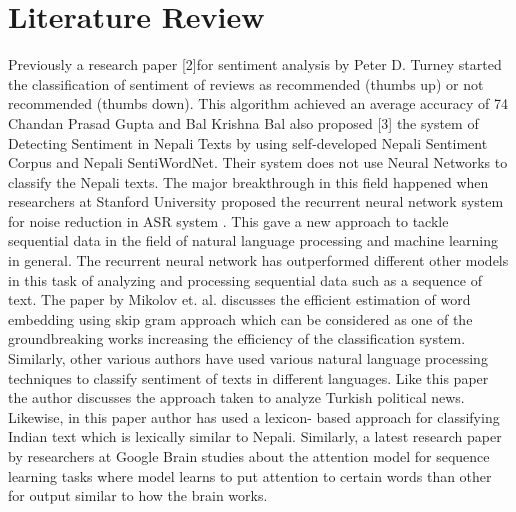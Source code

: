     \chapter{Literature Review}
       Previously a research paper [2]for sentiment analysis by Peter D. Turney started the
classification of sentiment of reviews as recommended (thumbs up) or not
recommended (thumbs down). This algorithm achieved an average accuracy of 74%
Chandan Prasad Gupta and Bal Krishna Bal also proposed [3] the system of Detecting
Sentiment in Nepali Texts by using self-developed Nepali Sentiment Corpus and Nepali
SentiWordNet. Their system does not use Neural Networks to classify the Nepali texts.
The major breakthrough in this field happened when researchers at Stanford University
proposed the recurrent neural network system for noise reduction in ASR system
\cite{liu2012sentiment}
.
This gave a new approach to tackle sequential data in the field of natural language
processing and machine learning in general. The recurrent neural network has
outperformed different other models in this task of analyzing and processing sequential
data such as a sequence of text.
The paper \cite{shrestha2016new} by Mikolov et. al. discusses the efficient estimation of word embedding
using skip gram approach which can be considered as one of the groundbreaking works
increasing the efficiency of the classification system. Similarly, other various authors
have used various natural language processing techniques to classify sentiment of texts
in different languages. Like this paper
\cite{kaya2012sentiment}
the author discusses the approach taken to
analyze Turkish political news. Likewise, in this paper
\cite{sharma2015practical}
author has used a lexicon-
based approach for classifying Indian text which is lexically similar to Nepali.
Similarly, a latest research paper
\cite{vaswani2017attention}
by researchers at Google Brain studies about the
attention model for sequence learning tasks where model learns to put attention to
certain words than other for output similar to how the brain works.
